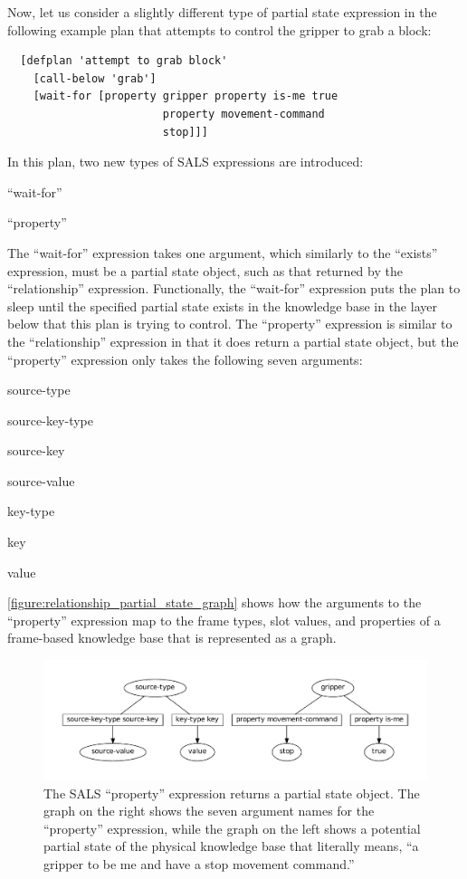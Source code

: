 Now, let us consider a slightly different type of partial state
expression in the following example plan that attempts to control the
gripper to grab a block:
\begin{samepage}
\begin{Verbatim}
  [defplan 'attempt to grab block'
    [call-below 'grab']
    [wait-for [property gripper property is-me true
                        property movement-command
                        stop]]]
\end{Verbatim}
\end{samepage}
In this plan, two new types of SALS expressions are introduced:
\begin{packed_itemize}
\item{``wait-for''}
\item{``property''}
\end{packed_itemize}
The ``wait-for'' expression takes one argument, which similarly to the
``exists'' expression, must be a partial state object, such as that
returned by the ``relationship'' expression.  Functionally, the
``wait-for'' expression puts the plan to sleep until the specified
partial state exists in the knowledge base in the layer below that
this plan is trying to control.  The ``property'' expression is
similar to the ``relationship'' expression in that it does return a
partial state object, but the ``property'' expression only takes the
following seven arguments:
\begin{packed_enumerate}
\item{source-type}
\item{source-key-type}
\item{source-key}
\item{source-value}
\item{key-type}
\item{key}
\item{value}
\end{packed_enumerate}
{\mbox{\autoref{figure:relationship_partial_state_graph}}} shows how
the arguments to the ``property'' expression map to the frame types,
slot values, and properties of a frame-based knowledge base that is
represented as a graph.
\begin{figure}
\centering
\includegraphics[width=12cm]{gfx/property_partial_state_graph}
\caption[The SALS ``property'' expression returns a partial state
  object.]{The SALS ``property'' expression returns a partial state
  object.  The graph on the right shows the seven argument names for
  the ``property'' expression, while the graph on the left shows a
  potential partial state of the physical knowledge base that
  literally means, ``a gripper to be me and have a stop movement
  command.''}
\label{figure:property_partial_state_graph}
\end{figure}

